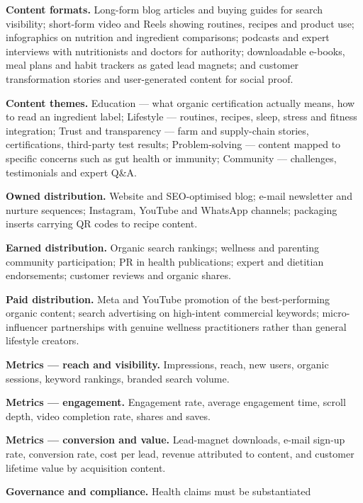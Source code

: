\begin{qlist}
\begin{apts}
\item \textbf{Content formats.} Long-form blog articles and buying guides for
      search visibility; short-form video and Reels showing routines, recipes
      and product use; infographics on nutrition and ingredient comparisons;
      podcasts and expert interviews with nutritionists and doctors for
      authority; downloadable e-books, meal plans and habit trackers as gated
      lead magnets; and customer transformation stories and user-generated
      content for social proof.
\item \textbf{Content themes.} Education --- what organic certification actually
      means, how to read an ingredient label; Lifestyle --- routines, recipes,
      sleep, stress and fitness integration; Trust and transparency --- farm and
      supply-chain stories, certifications, third-party test results;
      Problem-solving --- content mapped to specific concerns such as gut health
      or immunity; Community --- challenges, testimonials and expert Q\&A.
\item \textbf{Owned distribution.} Website and SEO-optimised blog; e-mail
      newsletter and nurture sequences; Instagram, YouTube and WhatsApp
      channels; packaging inserts carrying QR codes to recipe content.
\item \textbf{Earned distribution.} Organic search rankings; wellness and
      parenting community participation; PR in health publications; expert and
      dietitian endorsements; customer reviews and organic shares.
\item \textbf{Paid distribution.} Meta and YouTube promotion of the
      best-performing organic content; search advertising on high-intent
      commercial keywords; micro-influencer partnerships with genuine wellness
      practitioners rather than general lifestyle creators.
\item \textbf{Metrics --- reach and visibility.} Impressions, reach, new users,
      organic sessions, keyword rankings, branded search volume.
\item \textbf{Metrics --- engagement.} Engagement rate, average engagement time,
      scroll depth, video completion rate, shares and saves.
\item \textbf{Metrics --- conversion and value.} Lead-magnet downloads, e-mail
      sign-up rate, conversion rate, cost per lead, revenue attributed to
      content, and customer lifetime value by acquisition content.
\item \textbf{Governance and compliance.} Health claims must be substantiated

\end{apts}
\end{qlist}
